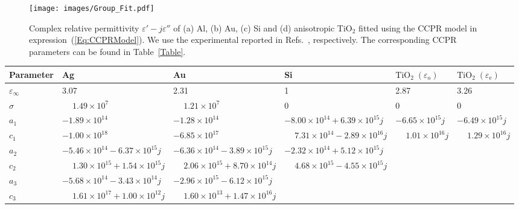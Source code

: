 \documentclass[aps,prl,twocolumn,superscriptaddress,longbibliography]{revtex4-1}
\begin{document}
\begin{figure}[t!]
\texttt{[image: images/Group\_Fit.pdf]}
\caption{\label{CCPR_Plot} Complex relative permittivity $\varepsilon'-j\varepsilon''$ of (a) Al, (b) Au, (c) Si and (d) anisotropic  TiO$_{\mathrm{2}}$ fitted using the CCPR model in expression~(\ref{Eq:CCPRModel}). We use the experimental reported in Refs.~\cite{Rakic:95, Au_Johnson, Si_Schinke, DeVore:51}, respectively. The corresponding CCPR parameters can be found in Table~\ref{Table}.}
\end{figure}

\begin{table*}
 \centering      
{
\scriptsize \setlength{\tabcolsep}{2.7pt}
\begin{tabular}{ l  l  l  l  l l }\hline
     \textbf{Parameter}                   & Ag & Au                    & Si                    &      $\mathrm{TiO}_{2}\; (\varepsilon_{\mathrm{o}})$      & $\mathrm{TiO}_{2}\; (\varepsilon_{\mathrm{e}})$  \\\hline
 $\varepsilon_{\infty}$ &  \phantom{1.}3.07    &   \phantom{1.}2.31                     & \phantom{1.}1                         &  \phantom{1.}2.87                    & \phantom{1.}3.26  \\
 $\sigma$               &  $\phantom{-}1.49 \times 10^7$     &   $\phantom{-}1.21 \times 10^7$       & \phantom{1.}0                         & \phantom{1.}0                        & \phantom{1.}0  \\
 $a_1$                  &  $-1.89 \times 10^{14}$ & $-1.28 \times 10^{14}$           & $-8.00 \times 10^{14}+6.39 \times 10^{15} j$            & $-6.65 \times 10^{15} j$                   &  $-6.49 \times 10^{15} j$  \\     
 $c_1$                  &  $-1.00 \times 10^{18}$ & $-6.85 \times 10^{17} $          & $\phantom{-}7.31 \times 10^{14}-2.89 \times 10^{16} j$  & $\phantom{-}1.01 \times 10^{16} j$                   &  $\phantom{-}1.29 \times 10^{16} j$  \\   
 $a_2$                  &  $-5.46 \times 10^{14}-6.37 \times 10^{15} j$              & $-6.36 \times 10^{14}-3.89 \times 10^{15} j$            & $-2.32 \times 10^{14}+ 5.12 \times 10^{15} j$    &                  &  \\            
 $c_2$                  &  $\phantom{-}1.30 \times 10^{15}+1.54 \times 10^{15} j$    & $\phantom{-}2.06 \times 10^{15}+ 8.70 \times 10^{14} j$ & $\phantom{-}4.68 \times 10^{15}-4.55 \times 10^{15} j$     &                     &  \\
 $a_3$                  &  $-5.68 \times 10^{14}-3.43 \times 10^{14} j$              & $-2.96 \times 10^{15}-6.12 \times 10^{15} j$            &                       &                      &  \\
 $c_3$                  &  $\phantom{-}1.61 \times 10^{17}+1.00 \times 10^{12} j$    & $\phantom{-}1.60 \times 10^{13}+1.47 \times 10^{16} j$  &                       &                    &  \\\hline
\end{tabular}}
\caption{CCPR parameters for the permittivity spectral fitting in Fig.~\ref{CCPR_Plot}.}
\label{Table}
\end{table*}
\end{document}
